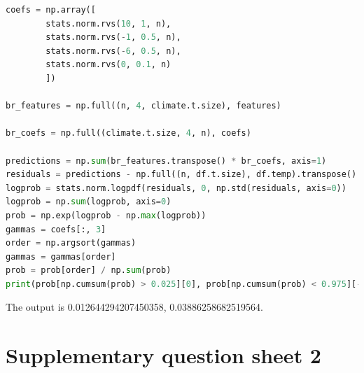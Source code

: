 \documentclass[10pt,\jkfside,a4paper]{article}
\begin{document}
\begin{enumerate}
\begin{lstlisting}[language=Python]
coefs = np.array([
		stats.norm.rvs(10, 1, n),
		stats.norm.rvs(-1, 0.5, n),
		stats.norm.rvs(-6, 0.5, n),
		stats.norm.rvs(0, 0.1, n)
		])

br_features = np.full((n, 4, climate.t.size), features)

br_coefs = np.full((climate.t.size, 4, n), coefs)

predictions = np.sum(br_features.transpose() * br_coefs, axis=1)
residuals = predictions - np.full((n, df.t.size), df.temp).transpose()
logprob = stats.norm.logpdf(residuals, 0, np.std(residuals, axis=0))
logprob = np.sum(logprob, axis=0)
prob = np.exp(logprob - np.max(logprob))
gammas = coefs[:, 3]
order = np.argsort(gammas)
gammas = gammas[order]
prob = prob[order] / np.sum(prob)
print(prob[np.cumsum(prob) > 0.025][0], prob[np.cumsum(prob) < 0.975][-1])
\end{lstlisting}

The output is 0.012644294207450358, 0.03886258682519564.

\end{enumerate}

\section{Supplementary question sheet 2}
\end{document}
